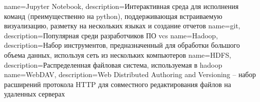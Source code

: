 {
    name=Jupyter Notebook,
    description={Интерактивная среда для исполнения команд (преимущественно на \gls{python}), поддерживающая встраиваемую визуализацию, разметку на нескольких языках и создание отчетов}
}
{
    name=git,
    description={Популярная среди разработчиков ПО \acrshort{vcs}}
}
{
    name=Hadoop,
    description={Набор инструментов, предназначенный для обработки большого объема данных, используя сеть из нескольких компьютеров}
}
{
    name=HDFS,
    description={Распределенная файловая система, используемая в \gls{hadoop}}
}
{
    name=WebDAV,
    description={Web Distributed Authoring and Versioning -- набор расширений протокола HTTP для совместного редактирования файлов на удаленных серверах}
}
